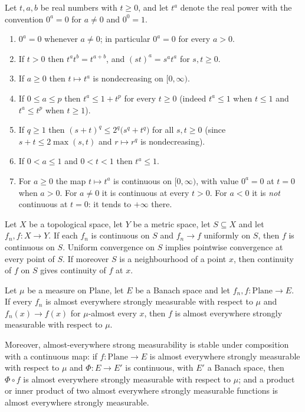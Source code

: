 \begin{proposition}
Let $t,a,b$ be real numbers with $t\ge0$, and let $t^{a}$ denote the real power with the
convention $0^{a}=0$ for $a\neq0$ and $0^{0}=1$.
\begin{enumerate}
\item $0^{a}=0$ whenever $a\neq0$; in particular $0^{a}=0$ for every $a>0$.
\item If $t>0$ then $t^{a}t^{b}=t^{a+b}$, and $(st)^{a}=s^{a}t^{a}$ for $s,t\ge0$.
\item If $a\ge0$ then $t\mapsto t^{a}$ is nondecreasing on $[0,\infty)$.
\item If $0\le a\le p$ then $t^{a}\le1+t^{p}$ for every $t\ge0$ (indeed $t^{a}\le1$ when
$t\le1$ and $t^{a}\le t^{p}$ when $t\ge1$).
\item If $q\ge1$ then $(s+t)^{q}\le2^{q}\bigl(s^{q}+t^{q}\bigr)$ for all $s,t\ge0$ (since
$s+t\le2\max(s,t)$ and $r\mapsto r^{q}$ is nondecreasing).
\item If $0<a\le1$ and $0<t<1$ then $t^{a}\le1$.
\item For $a\ge0$ the map $t\mapsto t^{a}$ is continuous on $[0,\infty)$, with value
$0^{a}=0$ at $t=0$ when $a>0$.  For $a\neq0$ it is continuous at every $t>0$.  For $a<0$ it is
\emph{not} continuous at $t=0$: it tends to $+\infty$ there.
\end{enumerate}
\end{proposition}

\begin{proposition}
Let $X$ be a topological space, let $Y$ be a metric space, let $S\subseteq X$ and let
$f_n,f\colon X\to Y$.  If each $f_n$ is continuous on $S$ and $f_n\to f$ uniformly on $S$,
then $f$ is continuous on $S$.  Uniform convergence on $S$ implies pointwise convergence at
every point of $S$.  If moreover $S$ is a neighbourhood of a point $x$, then continuity of $f$
on $S$ gives continuity of $f$ at $x$.
\end{proposition}

\begin{proposition}
Let $\mu$ be a measure on $\mathrm{Plane}$, let $E$ be a Banach space and let
$f_n,f\colon\mathrm{Plane}\to E$.  If every $f_n$ is almost everywhere strongly measurable
with respect to $\mu$ and $f_n(x)\to f(x)$ for $\mu$-almost every $x$, then $f$ is almost
everywhere strongly measurable with respect to $\mu$.

Moreover, almost-everywhere strong measurability is stable under composition with a continuous
map: if $f\colon\mathrm{Plane}\to E$ is almost everywhere strongly measurable with respect to
$\mu$ and $\Phi\colon E\to E'$ is continuous, with $E'$ a Banach space, then $\Phi\circ f$ is
almost everywhere strongly measurable with respect to $\mu$; and a product or inner product of
two almost everywhere strongly measurable functions is almost everywhere strongly measurable.
\end{proposition}

